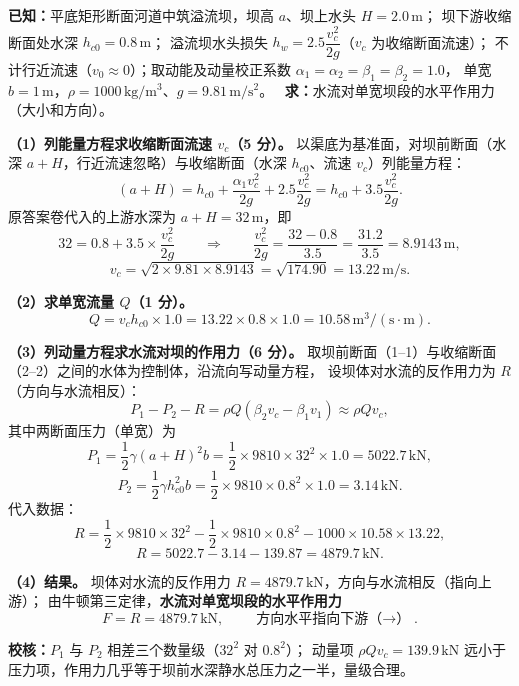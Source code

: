 
\begin{jie}
\textbf{已知：}平底矩形断面河道中筑溢流坝，坝高 $a$、坝上水头 $H=2.0\,\mathrm{m}$；
坝下游收缩断面处水深 $h_{c0}=0.8\,\mathrm{m}$；
溢流坝水头损失 $h_w=2.5\dfrac{v_c^{2}}{2g}$（$v_c$ 为收缩断面流速）；
不计行近流速（$v_0\approx0$）；取动能及动量校正系数 $\alpha_1=\alpha_2=\beta_1=\beta_2=1.0$，
单宽 $b=1\,\mathrm{m}$，$\rho=1000\,\mathrm{kg/m^{3}}$、$g=9.81\,\mathrm{m/s^{2}}$。
\ \textbf{求：}水流对单宽坝段的水平作用力（大小和方向）。

\textbf{（1）列能量方程求收缩断面流速 $v_c$（5 分）。}
以渠底为基准面，对坝前断面（水深 $a+H$，行近流速忽略）与收缩断面（水深 $h_{c0}$、流速 $v_c$）列能量方程：
\[
(a+H)=h_{c0}+\frac{\alpha_1v_c^{2}}{2g}+2.5\frac{v_c^{2}}{2g}
=h_{c0}+3.5\frac{v_c^{2}}{2g}.
\]
原答案卷代入的上游水深为 $a+H=32\,\mathrm{m}$，即
\[
32=0.8+3.5\times\frac{v_c^{2}}{2g}
\qquad\Longrightarrow\qquad
\frac{v_c^{2}}{2g}=\frac{32-0.8}{3.5}=\frac{31.2}{3.5}=8.9143\,\mathrm{m},
\]
\[
v_c=\sqrt{2\times9.81\times8.9143}=\sqrt{174.90}=13.22\,\mathrm{m/s}.
\]

\textbf{（2）求单宽流量 $Q$（1 分）。}
\[
Q=v_ch_{c0}\times1.0=13.22\times0.8\times1.0=10.58\,\mathrm{m^{3}/(s\cdot m)}.
\]

\textbf{（3）列动量方程求水流对坝的作用力（6 分）。}
取坝前断面（1--1）与收缩断面（2--2）之间的水体为控制体，沿流向写动量方程，
设坝体对水流的反作用力为 $R$（方向与水流相反）：
\[
P_1-P_2-R=\rho Q\left(\beta_2v_c-\beta_1v_1\right)\approx\rho Qv_c ,
\]
其中两断面压力（单宽）为
\[
P_1=\frac{1}{2}\gamma(a+H)^{2}b=\frac{1}{2}\times9810\times32^{2}\times1.0=5022.7\,\mathrm{kN},
\]
\[
P_2=\frac{1}{2}\gamma h_{c0}^{2}b=\frac{1}{2}\times9810\times0.8^{2}\times1.0=3.14\,\mathrm{kN}.
\]
代入数据：
\[
R=\frac{1}{2}\times9810\times32^{2}-\frac{1}{2}\times9810\times0.8^{2}-1000\times10.58\times13.22,
\]
\[
R=5022.7-3.14-139.87=4879.7\,\mathrm{kN}.
\]

\textbf{（4）结果。}
坝体对水流的反作用力 $R=4879.7\,\mathrm{kN}$，方向与水流相反（指向上游）；
由牛顿第三定律，\textbf{水流对单宽坝段的水平作用力}
\[
\boxed{F=R=4879.7\,\mathrm{kN}},\qquad\textbf{方向水平指向下游（$\rightarrow$）}.
\]

\textbf{校核：}$P_1$ 与 $P_2$ 相差三个数量级（$32^{2}$ 对 $0.8^{2}$）；
动量项 $\rho Qv_c=139.9\,\mathrm{kN}$ 远小于压力项，作用力几乎等于坝前水深静水总压力之一半，量级合理。
\end{jie}

